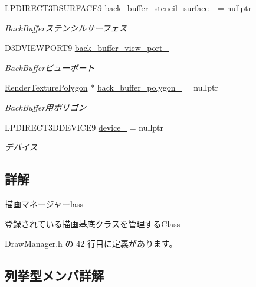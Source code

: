 \begin{DoxyCompactItemize}
L\+P\+D\+I\+R\+E\+C\+T3\+D\+S\+U\+R\+F\+A\+C\+E9 \mbox{\hyperlink{class_draw_manager_a960da519fffde5a40ee7b2c83e27da4e}{back\+\_\+buffer\+\_\+stencil\+\_\+surface\+\_\+}} = nullptr
\begin{DoxyCompactList}\small\item\em Back\+Bufferステンシルサーフェス \end{DoxyCompactList}\item 
D3\+D\+V\+I\+E\+W\+P\+O\+R\+T9 \mbox{\hyperlink{class_draw_manager_adcf39cdd0152a4f4a5b99ac3597db98b}{back\+\_\+buffer\+\_\+view\+\_\+port\+\_\+}}
\begin{DoxyCompactList}\small\item\em Back\+Bufferビューポート \end{DoxyCompactList}\item 
\mbox{\hyperlink{class_render_texture_polygon}{Render\+Texture\+Polygon}} $\ast$ \mbox{\hyperlink{class_draw_manager_a8f37453b63cfdc1033470ddf2ff8a992}{back\+\_\+buffer\+\_\+polygon\+\_\+}} = nullptr
\begin{DoxyCompactList}\small\item\em Back\+Buffer用ポリゴン \end{DoxyCompactList}\item 
L\+P\+D\+I\+R\+E\+C\+T3\+D\+D\+E\+V\+I\+C\+E9 \mbox{\hyperlink{class_draw_manager_a8a78d17df29e0b554192e29e0fda1b93}{device\+\_\+}} = nullptr
\begin{DoxyCompactList}\small\item\em デバイス \end{DoxyCompactList}\end{DoxyCompactItemize}


\subsection{詳解}
描画マネージャーlass 

登録されている描画基底クラスを管理する\+Class 

 Draw\+Manager.\+h の 42 行目に定義があります。



\subsection{列挙型メンバ詳解}
\mbox{\label{class_draw_manager_a7ade407aee706c02454da2e53a559c9c}} 
